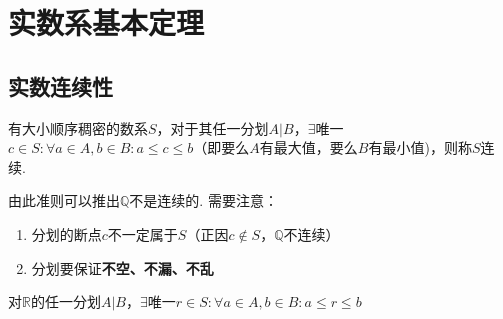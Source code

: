 
\section{实数系基本定理}
\subsection{实数连续性}
\begin{definition}
有大小顺序稠密的数系$S$，对于其任一分划$A|B$，$\exists$唯一$c\in S:\forall a\in A,b\in B:a\leq c\leq b$（即要么$A$有最大值，要么$B$有最小值)，则称$S$连续. 
\end{definition}
由此准则可以推出$\mathbb{Q}$不是连续的. 需要注意：
\begin{enumerate}
	\itemsep -3pt
	\item 分划的断点$c$不一定属于$S$（正因$c\notin S$，$\mathbb{Q}$不连续）
	\item 分划要保证\textbf{不空、不漏、不乱}
\end{enumerate}
\begin{theorem}[实数基本定理]
对$\mathbb{R}$的任一分划$A|B$，$\exists$唯一$r\in S:\forall a\in A,b\in B:a\leq r\leq b$
\end{theorem}

